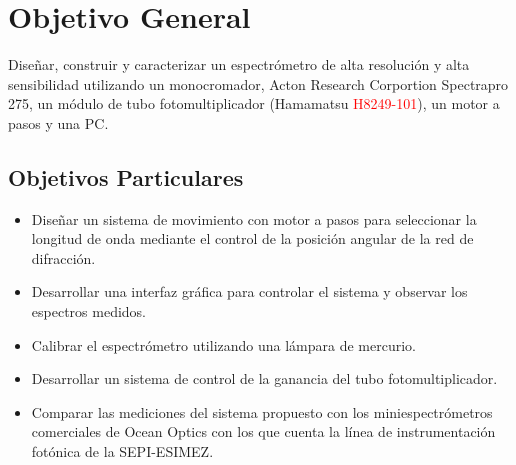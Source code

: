 \chapter*{Objetivo General}
Diseñar, construir y caracterizar un espectrómetro de alta resolución y alta sensibilidad utilizando un monocromador, Acton Research Corportion Spectrapro 275,  un módulo de tubo fotomultiplicador (Hamamatsu \textcolor{red}{H8249-101}), un motor a pasos y una PC.
\section*{Objetivos Particulares}
\begin{itemize}
\item Diseñar un sistema de movimiento con motor a pasos para seleccionar la longitud de onda mediante el control de la posición angular de la red de difracción.

\item Desarrollar una interfaz gráfica para controlar el sistema y observar los espectros medidos.

\item Calibrar el espectrómetro utilizando una lámpara de mercurio.

\item Desarrollar un sistema de control de la ganancia del tubo fotomultiplicador.

\item Comparar las mediciones del sistema propuesto con los miniespectrómetros comerciales de Ocean Optics con los que cuenta la línea de instrumentación fotónica de la SEPI-ESIMEZ.
\end{itemize}
